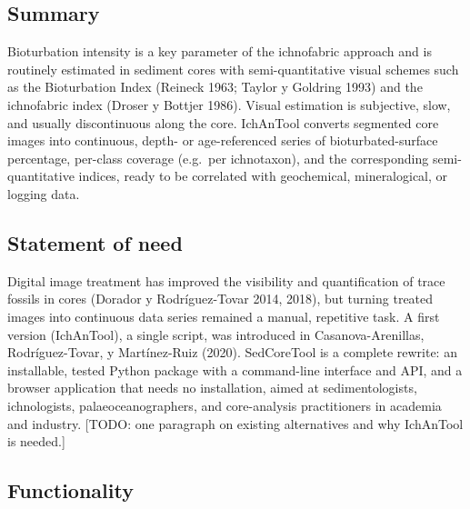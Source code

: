 \documentclass[
  10pt,
]{article}
\begin{document}
\hypertarget{summary}{%
\subsection{Summary}\label{summary}}

Bioturbation intensity is a key parameter of the ichnofabric approach
and is routinely estimated in sediment cores with semi-quantitative
visual schemes such as the Bioturbation Index (Reineck 1963; Taylor y
Goldring 1993) and the ichnofabric index (Droser y Bottjer 1986). Visual
estimation is subjective, slow, and usually discontinuous along the
core. IchAnTool converts segmented core images into continuous, depth-
or age-referenced series of bioturbated-surface percentage, per-class
coverage (e.g.~per ichnotaxon), and the corresponding semi-quantitative
indices, ready to be correlated with geochemical, mineralogical, or
logging data.

\hypertarget{statement-of-need}{%
\subsection{Statement of need}\label{statement-of-need}}

Digital image treatment has improved the visibility and quantification
of trace fossils in cores (Dorador y Rodríguez-Tovar 2014, 2018), but
turning treated images into continuous data series remained a manual,
repetitive task. A first version (IchAnTool), a single script, was
introduced in Casanova-Arenillas, Rodríguez-Tovar, y Martínez-Ruiz
(2020). SedCoreTool is a complete rewrite: an installable, tested Python
package with a command-line interface and API, and a browser application
that needs no installation, aimed at sedimentologists, ichnologists,
palaeoceanographers, and core-analysis practitioners in academia and
industry. {[}TODO: one paragraph on existing alternatives and why
IchAnTool is needed.{]}

\hypertarget{functionality}{%
\subsection{Functionality}\label{functionality}}
\end{document}
